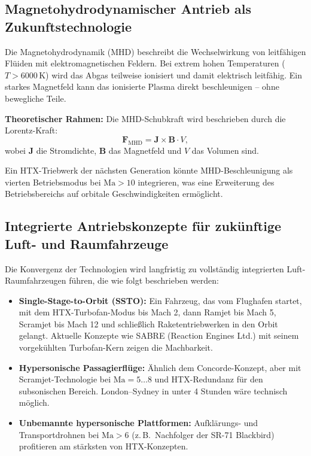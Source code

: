 ﻿\documentclass[12pt,a4paper]{article}
\theoremstyle{remark}
\newcommand{\Ma}{\mathrm{Ma}}
\begin{document}
\subsection{Magnetohydrodynamischer Antrieb als Zukunftstechnologie}

Die Magnetohydrodynamik (MHD) beschreibt die Wechselwirkung von
leitf\"ahigen Fl\"uiden mit elektromagnetischen Feldern.
Bei extrem hohen Temperaturen ($T > 6000\,\mathrm{K}$) wird
das Abgas teilweise ionisiert und damit elektrisch leitf\"ahig.
Ein starkes Magnetfeld kann das ionisierte Plasma direkt beschleunigen
-- ohne bewegliche Teile.

\textbf{Theoretischer Rahmen:}
Die MHD-Schubkraft wird beschrieben durch die Lorentz-Kraft:
\begin{equation}
  \mathbf{F}_{\mathrm{MHD}} = \mathbf{J} \times \mathbf{B} \cdot V,
  \label{eq:mhd}
\end{equation}
wobei $\mathbf{J}$ die Stromdichte, $\mathbf{B}$ das Magnetfeld und $V$ das Volumen sind.

Ein HTX-Triebwerk der n\"achsten Generation k\"onnte MHD-Beschleunigung
als vierten Betriebsmodus bei $\Ma > 10$ integrieren,
was eine Erweiterung des Betriebsbereichs auf orbitale Geschwindigkeiten erm\"oglicht.

\subsection{Integrierte Antriebskonzepte f\"ur zuk\"unftige Luft- und Raumfahrzeuge}

Die Konvergenz der Technologien wird langfristig zu vollst\"andig
integrierten Luft-Raumfahrzeugen f\"uhren, die wie folgt beschrieben werden:

\begin{itemize}
  \item \textbf{Single-Stage-to-Orbit (SSTO):}
        Ein Fahrzeug, das vom Flughafen startet, mit dem HTX-Turbofan-Modus
        bis Mach 2, dann Ramjet bis Mach 5, Scramjet bis Mach 12
        und schlie{\ss}lich Raketentriebwerken in den Orbit gelangt.
        Aktuelle Konzepte wie SABRE (Reaction Engines Ltd.)
        mit seinem vorgekühlten Turbofan-Kern zeigen die Machbarkeit.

  \item \textbf{Hypersonische Passagierfl\"uge:}
        \"Ahnlich dem Concorde-Konzept, aber mit Scramjet-Technologie
        bei $\Ma = 5\ldots 8$ und HTX-Redundanz f\"ur den subsonischen Bereich.
        London--Sydney in unter 4 Stunden w\"are technisch m\"oglich.

  \item \textbf{Unbemannte hypersonische Plattformen:}
        Aufkl\"arungs- und Transportdrohnen bei $\Ma > 6$
        (z.\,B.\ Nachfolger der SR-71 Blackbird)
        profitieren am st\"arksten von HTX-Konzepten.
\end{itemize}
\end{document}
